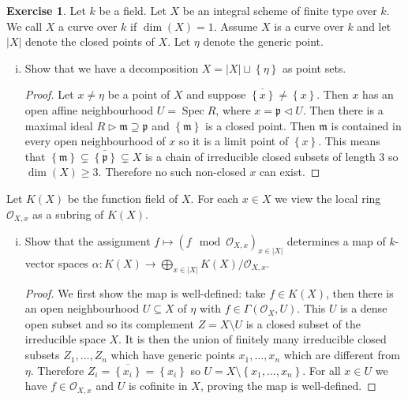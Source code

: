 \documentclass{article}
\newcommand{\sheaf}{\mathcal{O}}
\newcommand{\maxid}{\mathfrak{m}}
\newcommand{\primeid}{\mathfrak{p}}
\newcommand{\set}[1]{\left\{#1\right\}}
\DeclareMathOperator{\spec}{Spec}
\newcommand{\ideal}{\triangleleft}
\theoremstyle{definition}
\newtheorem{question}{Exercise}
\begin{document}
\begin{question}
    Let \(k\) be a field. Let \(X\) be an integral scheme of finite type over
    \(k\). We call \(X\) a curve over \(k\) if \(\dim(X)=1\). Assume \(X\) is a
    curve over \(k\) and let \(|X|\) denote the closed points of \(X\). Let
    \(\eta\) denote the generic point.

    \begin{enumerate}[(i)]
        \item Show that we have a decomposition \(X=|X|\sqcup\set{\eta}\) as
              point sets.

              \begin{proof}
                  Let \(x\neq\eta\) be a point of \(X\) and suppose
                  \(\overline{\set{x}}\neq\set{x}\). Then \(x\) has an open
                  affine neighbourhood \(U=\spec R\), where \(x=\primeid\ideal
                  U\). Then there is a maximal ideal
                  \(R\triangleright\maxid\supseteq\primeid\) and
                  \(\set{\maxid}\) is a closed point. Then \(\maxid\) is
                  contained in every open neighbourhood of \(x\) so it is a
                  limit point of \(\set{x}\). This means that
                  \(\set{\maxid}\subsetneq\bar{\set{\primeid}}\subsetneq X\) is
                  a chain of irreducible closed subsets of length \(3\) so
                  \(\dim(X)\geq 3\). Therefore no such non-closed \(x\) can
                  exist.
              \end{proof}
    \end{enumerate}

    Let \(K(X)\) be the function field of \(X\). For each \(x\in X\) we view the
    local ring \(\sheaf_{X,x}\) as a subring of \(K(X)\).

    \begin{enumerate}[(i), resume]
        \item Show that the assignment \(f\mapsto(f\mod \sheaf_{X,x})_{x\in|X|}\)
              determines a map of \(k\)-vector spaces
              \(\alpha:K(X)\to\bigoplus_{x\in|X|}K(X)/\sheaf_{X,x}\).

              \begin{proof}
                  We first show the map is well-defined: take \(f\in K(X)\),
                  then there is an open neighbourhood \(U\subseteq X\) of
                  \(\eta\) with \(f\in\Gamma(\sheaf_{X},U)\). This \(U\) is a
                  dense open subset and so its complement \(Z=X\setminus U\) is
                  a closed subset of the irreducible space \(X\). It is then the
                  union of finitely many irreducible closed subsets
                  \(Z_{1},\ldots,Z_{n}\) which have generic points
                  \(x_{1},\ldots,x_{n}\) which are different from \(\eta\).
                  Therefore \(Z_{i}=\overline{\set{x_{i}}}=\set{x_{i}}\) so
                  \(U=X\setminus\set{x_{1},\ldots,x_{n}}\). For all \(x\in U\)
                  we have \(f\in\sheaf_{X,x}\) and \(U\) is cofinite in \(X\),
                  proving the map is well-defined.


\end{proof}
\end{enumerate}
\end{question}
\end{document}
